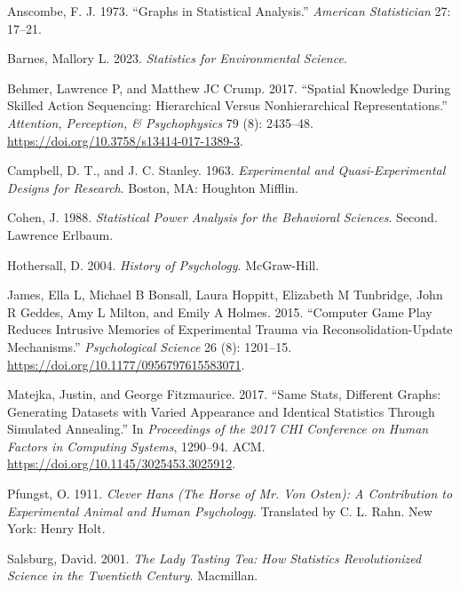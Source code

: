 \documentclass[
  letterpaper,
  DIV=11,
  numbers=noendperiod]{scrreprt}
\newlength{\cslhangindent}
\newenvironment{CSLReferences}[2] %
 {\begin{list}{}{%
  \setlength{\itemindent}{0pt}
  \setlength{\leftmargin}{0pt}
  \setlength{\parsep}{0pt}
  \ifodd #1
   \setlength{\leftmargin}{\cslhangindent}
   \setlength{\itemindent}{-1\cslhangindent}
  \fi
  \setlength{\itemsep}{#2\baselineskip}}}
 {\end{list}}
\begin{document}
\label{refs}
\begin{CSLReferences}{1}{0}
Anscombe, F. J. 1973. {``Graphs in Statistical Analysis.''}
\emph{American Statistician} 27: 17--21.

Barnes, Mallory L. 2023. \emph{Statistics for Environmental Science}.

Behmer, Lawrence P, and Matthew JC Crump. 2017. {``Spatial Knowledge
During Skilled Action Sequencing: {Hierarchical} Versus Nonhierarchical
Representations.''} \emph{Attention, Perception, \& Psychophysics} 79
(8): 2435--48. \url{https://doi.org/10.3758/s13414-017-1389-3}.

Campbell, D. T., and J. C. Stanley. 1963. \emph{Experimental and
Quasi-Experimental Designs for Research}. {Boston, MA}: {Houghton
Mifflin}.

Cohen, J. 1988. \emph{Statistical Power Analysis for the Behavioral
Sciences}. Second. {Lawrence Erlbaum}.

Hothersall, D. 2004. \emph{History of Psychology}. {McGraw-Hill}.

James, Ella L, Michael B Bonsall, Laura Hoppitt, Elizabeth M Tunbridge,
John R Geddes, Amy L Milton, and Emily A Holmes. 2015. {``Computer Game
Play Reduces Intrusive Memories of Experimental Trauma via
Reconsolidation-Update Mechanisms.''} \emph{Psychological Science} 26
(8): 1201--15. \url{https://doi.org/10.1177/0956797615583071}.

Matejka, Justin, and George Fitzmaurice. 2017. {``Same Stats, Different
Graphs: Generating Datasets with Varied Appearance and Identical
Statistics Through Simulated Annealing.''} In \emph{Proceedings of the
2017 {CHI} Conference on Human Factors in Computing Systems}, 1290--94.
{ACM}. \url{https://doi.org/10.1145/3025453.3025912}.

Pfungst, O. 1911. \emph{Clever {Hans} ({The} Horse of {Mr}. Von
{Osten}): {A} Contribution to Experimental Animal and Human Psychology}.
Translated by C. L. Rahn. {New York}: {Henry Holt}.

Salsburg, David. 2001. \emph{The Lady Tasting Tea: {How} Statistics
Revolutionized Science in the Twentieth Century}. {Macmillan}.


\end{CSLReferences}
\end{document}
